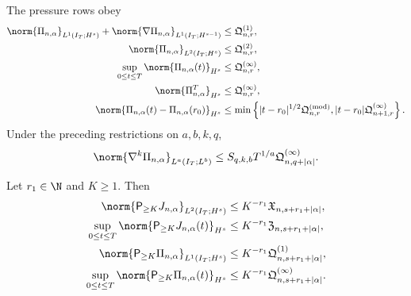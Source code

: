 {\begin{theorem}
The pressure rows obey
\begin{align}
 \norm{\Pi_{n,\alpha}}_{L^1(I_T;H^s)}
 +\norm{\nabla\Pi_{n,\alpha}}_{L^1(I_T;H^{s-1})}
 &\le\mathfrak Q^{(1)}_{n,r},
 \label{u:eq:qc-sharp-pressure-L1}\\
 \norm{\Pi_{n,\alpha}}_{L^2(I_T;H^s)}
 &\le\mathfrak Q^{(2)}_{n,r},
 \label{u:eq:qc-sharp-pressure-L2}\\
 \sup_{0\le t\le T}\norm{\Pi_{n,\alpha}(t)}_{H^s}
 &\le\mathfrak Q^{(\infty)}_{n,r},
 \label{u:eq:qc-sharp-pressure-sup}\\
 \norm{\Pi_{n,\alpha}^T}_{H^s}
 &\le\mathfrak Q^{(\infty)}_{n,r},
 \label{u:eq:qc-sharp-pressure-endpoint}\\
 \norm{\Pi_{n,\alpha}(t)-\Pi_{n,\alpha}(r_0)}_{H^s}
 &\le\min\left\{
 |t-r_0|^{1/2}\mathfrak Q^{(\mathrm{mod})}_{n,r},
 |t-r_0|\mathfrak Q^{(\infty)}_{n+1,r}
 \right\}.
 \label{u:eq:qc-sharp-pressure-modulus}
\end{align}
Under the preceding restrictions on \(a,b,k,q\),
\begin{equation}
 \norm{\nabla^k\Pi_{n,\alpha}}_{L^a(I_T;L^b)}
 \le S_{q,k,b}T^{1/a}
 \mathfrak Q^{(\infty)}_{n,q+|\alpha|}.
 \label{u:eq:qc-sharp-pressure-Lab}
\end{equation}

Let \(r_1\in\N\) and \(K\ge1\).  Then
\begin{align}
 \norm{\mathsf P_{\ge K}J_{n,\alpha}}_{L^2(I_T;H^s)}
 &\le K^{-r_1}\mathfrak X_{n,s+r_1+|\alpha|},
 \label{u:eq:qc-sharp-velocity-tail-L2}\\
 \sup_{0\le t\le T}
 \norm{\mathsf P_{\ge K}J_{n,\alpha}(t)}_{H^s}
 &\le K^{-r_1}\mathfrak Z_{n,s+r_1+|\alpha|},
 \label{u:eq:qc-sharp-velocity-tail-sup}\\
 \norm{\mathsf P_{\ge K}\Pi_{n,\alpha}}_{L^1(I_T;H^s)}
 &\le K^{-r_1}\mathfrak Q^{(1)}_{n,s+r_1+|\alpha|},
 \label{u:eq:qc-sharp-pressure-tail-L1}\\
 \sup_{0\le t\le T}
 \norm{\mathsf P_{\ge K}\Pi_{n,\alpha}(t)}_{H^s}
 &\le K^{-r_1}\mathfrak Q^{(\infty)}_{n,s+r_1+|\alpha|}.
 \label{u:eq:qc-sharp-pressure-tail-sup}
\end{align}


\end{theorem}}
